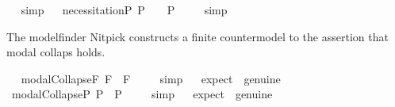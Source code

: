 \begin{isabellebody}
\isadelimproof
\ %
\endisadelimproof
%
\isatagproof
{}\isamarkupfalse%
\ simp%
\endisatagproof
{\isafoldproof}%
%
\isadelimproof
%
\endisadelimproof
\isanewline
\ \isamarkupfalse%
\ necessitationP{\isacharcolon}\ {\isachardoublequoteopen}{\isacharbrackleft}{\isasymphi}\isactrlsup P{\isacharbrackright}\ {\isacharequal}\ {\isasymtop}\ {\isasymlongrightarrow}\ {\isacharbrackleft}\isactrlbold {\isasymbox}{\isasymphi}\isactrlsup P{\isacharbrackright}\ {\isacharequal}\ {\isasymtop}{\isachardoublequoteclose}%
\isadelimproof
\ %
\endisadelimproof
%
\isatagproof
{}\isamarkupfalse%
\ simp%
\endisatagproof
{\isafoldproof}%
%
\isadelimproof
%
\endisadelimproof
%
\isamarkuptrue%
%
\begin{isamarkuptext}%
The modelfinder Nitpick constructs a finite countermodel to the assertion
  that modal collaps holds.%
\end{isamarkuptext}%
\isamarkuptrue%
\ \isamarkupfalse%
\ modalCollapseF{\isacharcolon}\ {\isachardoublequoteopen}{\isacharbrackleft}{\isasymphi}\isactrlsup F\ \isactrlbold {\isasymrightarrow}\ \isactrlbold {\isasymbox}{\isasymphi}\isactrlsup F{\isacharbrackright}\ {\isacharequal}\ {\isasymtop}{\isachardoublequoteclose}%
\isadelimproof
\ %
\endisadelimproof
%
\isatagproof
{}\isamarkupfalse%
\ simp%
\endisatagproof
{\isafoldproof}%
%
\isadelimproof
%
\endisadelimproof
\ \isamarkupfalse%
\ {\isacharbrackleft}expect\ {\isacharequal}\ genuine{\isacharbrackright}%
\isadelimproof
\ %
\endisadelimproof
%
\isatagproof
{}\isamarkupfalse%
\ %
%
\endisatagproof
{\isafoldproof}%
%
\isadelimproof
%
\endisadelimproof
\isanewline
\ \isamarkupfalse%
\ modalCollapseP{\isacharcolon}\ {\isachardoublequoteopen}{\isacharbrackleft}{\isasymphi}\isactrlsup P\ \isactrlbold {\isasymrightarrow}\ \isactrlbold {\isasymbox}{\isasymphi}\isactrlsup P{\isacharbrackright}\ {\isacharequal}\ {\isasymtop}{\isachardoublequoteclose}%
\isadelimproof
\ %
\endisadelimproof
%
\isatagproof
{}\isamarkupfalse%
\ simp%
\endisatagproof
{\isafoldproof}%
%
\isadelimproof
%
\endisadelimproof
\ \isamarkupfalse%
\ {\isacharbrackleft}expect\ {\isacharequal}\ genuine{\isacharbrackright}%
\isadelimproof
\ %
\endisadelimproof
%
\isatagproof
{}\isamarkupfalse%
\ %
%
\endisatagproof
{\isafoldproof}%
%
\isadelimproof
%
\endisadelimproof

\end{isabellebody}
